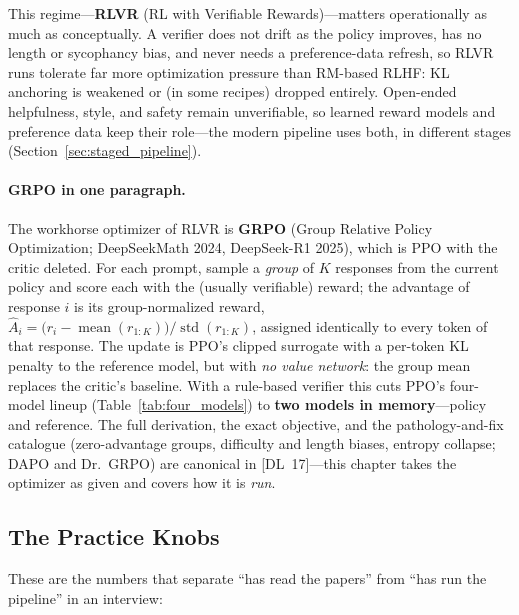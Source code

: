 This regime---\textbf{RLVR} (RL with Verifiable Rewards)---matters
operationally as much as conceptually.  A verifier does not drift as the
policy improves, has no length or sycophancy bias, and never needs a
preference-data refresh, so RLVR runs tolerate far more optimization
pressure than RM-based RLHF: KL anchoring is weakened or (in some recipes)
dropped entirely.  Open-ended helpfulness, style, and safety remain
unverifiable, so learned reward models and preference data keep their
role---the modern pipeline uses both, in different stages
(Section~\ref{sec:staged_pipeline}).

\paragraph{GRPO in one paragraph.}
The workhorse optimizer of RLVR is \textbf{GRPO} (Group Relative Policy
Optimization; DeepSeekMath 2024, DeepSeek-R1 2025), which is PPO with the
critic deleted.  For each prompt, sample a \emph{group} of $K$ responses
from the current policy and score each with the (usually verifiable)
reward; the advantage of response $i$ is its group-normalized reward,
$\hat{A}_i = \bigl(r_i - \operatorname{mean}(r_{1:K})\bigr) /
\operatorname{std}(r_{1:K})$, assigned identically to every token of that
response.  The update is PPO's clipped surrogate with a per-token KL
penalty to the reference model, but with \emph{no value network}: the
group mean replaces the critic's baseline.  With a rule-based verifier
this cuts PPO's four-model lineup (Table~\ref{tab:four_models}) to
\textbf{two models in memory}---policy and reference.  The full
derivation, the exact objective, and the pathology-and-fix catalogue
(zero-advantage groups, difficulty and length biases, entropy collapse;
DAPO and Dr.~GRPO) are canonical in [DL~17]---this chapter takes the
optimizer as given and covers how it is \emph{run}.

\subsection{The Practice Knobs}

These are the numbers that separate ``has read the papers'' from ``has run
the pipeline'' in an interview:

